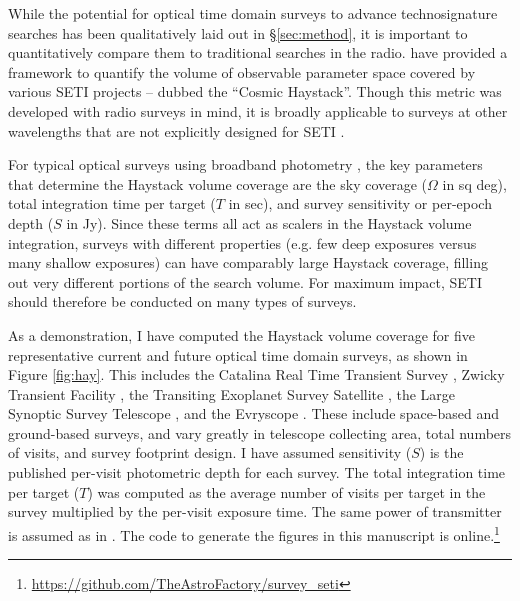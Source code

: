 \documentclass[twocolumn]{aastex62}
\newcommand{\TESS}{\textsl{TESS}\xspace}
\begin{document}
While the potential for optical time domain surveys to advance technosignature searches has been qualitatively laid out in \S\ref{sec:method}, it is important to quantitatively compare them to traditional searches in the radio. 
\citet{wright2018c} have provided a framework to quantify the volume of observable parameter space covered by various SETI projects -- dubbed the ``Cosmic Haystack''. Though this metric was developed with radio surveys in mind, it is broadly applicable to surveys at other wavelengths that are not explicitly designed for SETI \citep[e.g. see][]{forgan2019}.

For typical optical surveys using broadband photometry \citep{djorgovski2013}, the key parameters that determine the Haystack volume coverage are the sky coverage ($\Omega$ in sq deg), total integration time per target ($T$ in sec), and survey sensitivity or per-epoch depth ($S$ in Jy).
Since these terms all act as scalers in the Haystack volume integration, surveys with different properties (e.g. few deep exposures versus many shallow exposures) can have comparably large Haystack coverage, filling out very different portions of the search volume. For maximum impact, SETI should therefore be conducted on many types of surveys.


As a demonstration, I have computed the Haystack volume coverage for five representative current and future optical time domain surveys, as shown in Figure \ref{fig:hay}. This includes the Catalina Real Time Transient Survey \citep[CRTS;][]{catalina}, Zwicky Transient Facility \citep[ZTF;][]{bellm2014}, the Transiting Exoplanet Survey Satellite \citep[\TESS;][]{tess}, the Large Synoptic Survey Telescope \citep[LSST;][]{lsst}, and the Evryscope \citep{law2015}. These include space-based and ground-based surveys, and vary greatly in telescope collecting area, total numbers of visits, and survey footprint design. 
I have assumed sensitivity ($S$) is the published per-visit photometric depth for each survey. The total integration time per target ($T$) was computed as the average number of visits per target in the survey multiplied by the per-visit exposure time. The same power of transmitter is assumed as in \citet{wright2018c}. 
The code to generate the figures in this manuscript is online.\footnote{\url{https://github.com/TheAstroFactory/survey_seti}}
\end{document}
